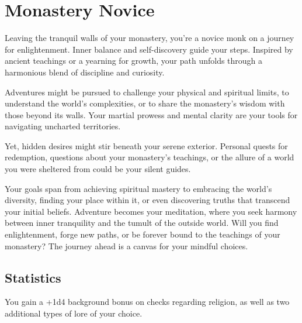 \section{Monastery Novice}\label{background:monasteryNovice}
Leaving the tranquil walls of your monastery, you're a novice monk on a journey for enlightenment.
Inner balance and self-discovery guide your steps.
Inspired by ancient teachings or a yearning for growth, your path unfolds through a harmonious blend of discipline and curiosity.

Adventures might be pursued to challenge your physical and spiritual limits, to understand the world's complexities, or to share the monastery's wisdom with those beyond its walls.
Your martial prowess and mental clarity are your tools for navigating uncharted territories.

Yet, hidden desires might stir beneath your serene exterior.
Personal quests for redemption, questions about your monastery's teachings, or the allure of a world you were sheltered from could be your silent guides.

Your goals span from achieving spiritual mastery to embracing the world's diversity, finding your place within it, or even discovering truths that transcend your initial beliefs.
Adventure becomes your meditation, where you seek harmony between inner tranquility and the tumult of the outside world.
Will you find enlightenment, forge new paths, or be forever bound to the teachings of your monastery?
The journey ahead is a canvas for your mindful choices.

\subsection{Statistics}
You gain a +1d4 background bonus on checks regarding religion, as well as two additional types of lore of your choice.
